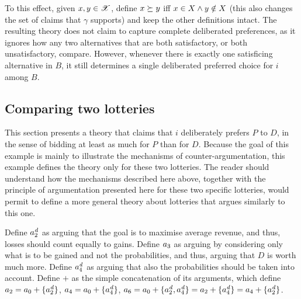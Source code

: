 \documentclass[version=last, pagesize, twoside=off, bibliography=totoc, DIV=calc, fontsize=12pt, a4paper, french, english]{scrartcl}
\begin{document}
To this effect, given $x, y \in \mathscr{X}$, define $x \succeq y$ iff $x \in X \land y \notin X$ (this also changes the set of claims that $\gamma$ supports) and keep the other definitions intact.
The resulting theory does not claim to capture complete deliberated preferences, as it ignores how any two alternatives that are both satisfactory, or both unsatisfactory, compare. However, whenever there is exactly one satisficing alternative in $B$, it still determines a single deliberated preferred choice for $i$ among $B$.

\subsection{Comparing two lotteries}
%
%
%
%
%
%
This section presents a theory that claims that $i$ deliberately prefers $P$ to $D$, in the sense of bidding at least as much for $P$ than for $D$. Because the goal of this example is mainly to illustrate the mechanisms of counter-argumentation, this example defines the theory only for these two lotteries. The reader should understand how the mechanisms described here above, together with the principle of argumentation presented here for these two specific lotteries, would permit to define a more general theory about lotteries that argues similarly to this one. 

Define $\ard[2]$ as arguing that the goal is to maximise average revenue, and thus, losses should count equally to gains. Define $\ar_3$ as arguing by considering only what is to be gained and not the probabilities, and thus, arguing that $D$ is worth much more. Define $\ard[4]$ as arguing that also the probabilities should be taken into account.
Define $+$ as the simple concatenation of its arguments, which define $\ar_2 = \ar_0 + \set{\ard[2]}$, $\ar_4 = \ar_0 + \set{\ard[4]}$, $\ar_6 = \ar_0 + \set{\ard[2], \ard[4]} = \ar_2 + \set{\ard[4]} = \ar_4 + \set{\ard[2]}$.
\end{document}
